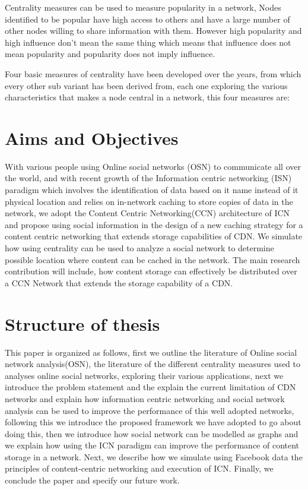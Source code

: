 Centrality measures can  be used to measure popularity in a network, Nodes identified to be popular have high access to others and have a large number of other nodes willing to share information  with them\cite{cross2001beyond}. However high popularity and high influence don't mean the same thing which means that influence does not mean popularity and popularity does not imply influence. 

Four basic measures of centrality have been developed over the years, from which every other sub variant has been derived from, each one exploring the various characteristics that makes a node central in a network, this four measures are:



\section{Aims and Objectives}

With various people using Online social networks (OSN) to communicate all over the world, and with recent growth of the Information centric networking (ISN) paradigm which involves the identification of data based on it name instead of it physical location and relies on in-network caching to store copies of data in the network, we adopt the Content Centric Networking(CCN) architecture of ICN and propose using social information in the design of a new caching strategy for a content centric networking that extends storage capabilities of CDN. We simulate how using centrality can be used to analyze a social network to determine possible location where content can be cached in the network. 
The main research contribution will include, how content storage can effectively be distributed over a CCN Network that extends the storage capability of a CDN. 



\section{Structure of thesis}

This paper is organized as follows, first we outline the literature of Online social network analysis(OSN), the literature of the different centrality measures used to analyses online social networks, exploring their various applications, next we introduce the problem statement and the explain the current limitation of CDN networks and explain how information centric networking and social network analysis can be used to improve the performance of this well adopted networks, following this we introduce the proposed framework we have adopted to go about doing this, then we introduce how social network can be modelled as graphs and we explain how using the ICN paradigm can improve the performance of content storage in a network. Next, we describe how we simulate using Facebook data the principles of content-centric networking and execution of ICN. Finally, we conclude the paper and specify our future work. 



